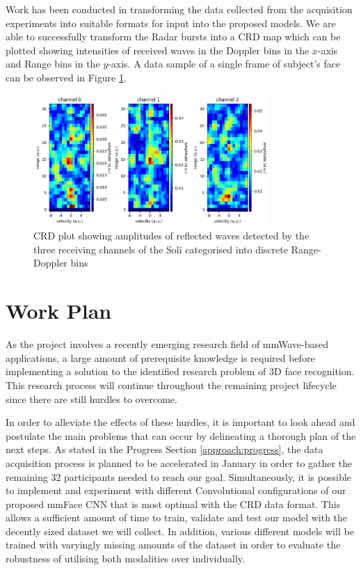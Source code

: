 \documentclass{interim}
\begin{document}
Work has been conducted in transforming the data collected from the acquisition experiments into suitable formats for input into the proposed models. We are able to successfully transform the Radar bursts into a CRD map which can be plotted showing intensities of received waves in the Doppler bins in the $x$-axis and Range bins in the $y$-axis. A data sample of a single frame of subject's face can be observed in Figure \ref{fig:crd_plot}.

\begin{figure}[h!]
    \centering
    \includegraphics[width=0.8\textwidth]{images/CRD_plot.png}
    \caption{CRD plot showing amplitudes of reflected waves detected by the three receiving channels of the Soli categorised into discrete Range-Doppler bins}
    \label{fig:crd_plot}
\end{figure}


\section{Work Plan}
As the project involves a recently emerging research field of mmWave-based applications, a large amount of prerequisite knowledge is required before implementing a solution to the identified research problem of 3D face recognition. This research process will continue throughout the remaining project lifecycle since there are still hurdles to overcome. 

In order to alleviate the effects of these hurdles, it is important to look ahead and postulate the main problems that can occur by delineating a thorough plan of the next steps. As stated in the Progress Section \ref{approach:progress}, the data acquisition process is planned to be accelerated in January in order to gather the remaining 32 participants needed to reach our goal. Simultaneously, it is possible to implement and experiment with different Convolutional configurations of our proposed mmFace CNN that is most optimal with the CRD data format. This allows a sufficient amount of time to train, validate and test our model with the decently sized dataset we will collect. In addition, various different models will be trained with varyingly missing amounts of the dataset in order to evaluate the robustness of utilising both modalities over individually.
\end{document}
